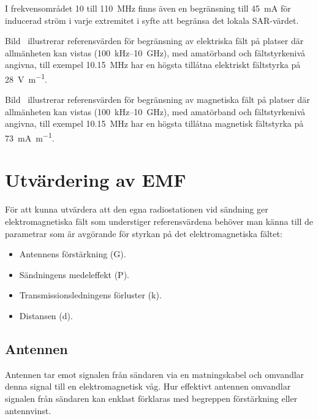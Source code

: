 I frekvensområdet 10 till \qty{110}{\mega\hertz} finns även en begränsning till
\qty{45}{\milli\ampere} för inducerad ström i varje extremitet i syfte att
begränsa det lokala SAR-värdet.

\newpage
{}

Bild~ illustrerar referensvärden för begränsning av elektriska
fält på platser där allmänheten kan vistas (100~kHz--10~GHz), med amatörband
och fältstyrkenivå angivna, till exempel \qty{10,15}{\mega\hertz} har en högsta
tillåtna elektriskt fältstyrka på \qty{28}{\volt\per\metre}.

\newpage
Bild~ illustrerar referensvärden för begränsning av magnetiska
fält på platser där allmänheten kan vistas (100~kHz--10~GHz), med amatörband
och fältstyrkenivå angivna, till exempel \qty{10,15}{\mega\hertz} har en högsta
tillåtna magnetisk fältstyrka på \qty{73}{\milli\ampere\per\metre}.

\clearpage
\section{Utvärdering av EMF}

För att kunna utvärdera att den egna radiostationen vid sändning ger
elektromagnetiska fält som understiger referensvärdena behöver man känna till
de parametrar som är avgörande för styrkan på det elektromagnetiska fältet:

\begin{itemize}
  \item Antennens förstärkning (G).
  \item Sändningens medeleffekt (P).
  \item Transmissionsledningens förluster (k).
  \item Distansen (d).
\end{itemize}

\subsection{Antennen}
Antennen tar emot signalen från sändaren via en matningskabel och
omvandlar denna signal till en elektromagnetisk våg.
Hur effektivt antennen omvandlar signalen från sändaren kan enklast förklaras
med begreppen förstärkning eller antennvinst.

